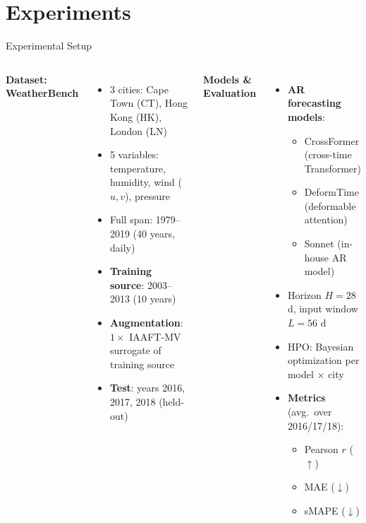 \documentclass[aspectratio=169,10pt]{beamer}
\begin{document}
\section{Experiments}

\begin{frame}{Experimental Setup}
  \begin{columns}[T]
      \textbf{Dataset: WeatherBench}
      \begin{itemize}
        \item 3 cities: Cape Town (CT), Hong Kong (HK), London (LN)
        \item 5 variables: temperature, humidity, wind ($u,v$), pressure
        \item Full span: 1979--2019 (40 years, daily)
        \item \textbf{Training source}: 2003--2013 (10 years)
        \item \textbf{Augmentation}: $1\times$ IAAFT-MV surrogate
              of training source
        \item \textbf{Test}: years 2016, 2017, 2018 (held-out)
      \end{itemize}

      \textbf{Models \& Evaluation}
      \begin{itemize}
        \item \textbf{AR forecasting models}:
          \begin{itemize}
            \item CrossFormer (cross-time Transformer)
            \item DeformTime (deformable attention)
            \item Sonnet (in-house AR model)
          \end{itemize}
        \item Horizon $H=28$ d, input window $L=56$ d
        \item HPO: Bayesian optimization per model $\times$ city
        \item \textbf{Metrics} (avg.\ over 2016/17/18):
          \begin{itemize}
            \item Pearson $r$ ($\uparrow$)
            \item MAE ($\downarrow$)
            \item sMAPE ($\downarrow$)
          \end{itemize}
      \end{itemize}
  \end{columns}
\end{frame}
\end{document}
